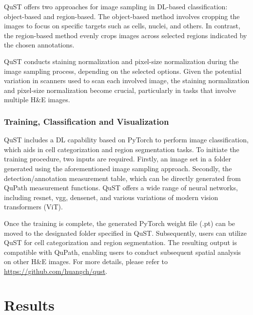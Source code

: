 \documentclass{article}
\begin{document}
QuST offers two approaches for image sampling in DL-based classification: object-based and region-based. The object-based method involves cropping the images to focus on specific targets such as cells, nuclei, and others. In contrast, the region-based method evenly crops images across selected regions indicated by the chosen annotations.

QuST conducts staining normalization and pixel-size normalization during the image sampling process, depending on the selected options. Given the potential variation in scanners used to scan each involved image, the staining normalization and pixel-size normalization become crucial, particularly in tasks that involve multiple H\&E images.

\subsubsection{Training, Classification and Visualization}
\label{sec:training_classification_and_visualization}

QuST includes a DL capability based on PyTorch  to perform image classification, which aids in cell categorization and region segmentation tasks. To initiate the training procedure, two inputs are required. Firstly, an image set in a folder generated using the aforementioned image sampling approach. Secondly, the detection/annotation measurement table, which can be directly generated from QuPath measurement functions. QuST offers a wide range of neural networks, including resnet, vgg, densenet, and various variations of modern vision transformers (ViT). 

Once the training is complete, the generated PyTorch weight file (.pt) can be moved to the designated folder specified in QuST. Subsequently, users can utilize QuST for cell categorization and region segmentation. The resulting output is compatible with QuPath, enabling users to conduct subsequent spatial analysis on other H\&E images. For more details, please refer to \url{https://github.com/huangch/qust}.

\section{Results}
\end{document}
